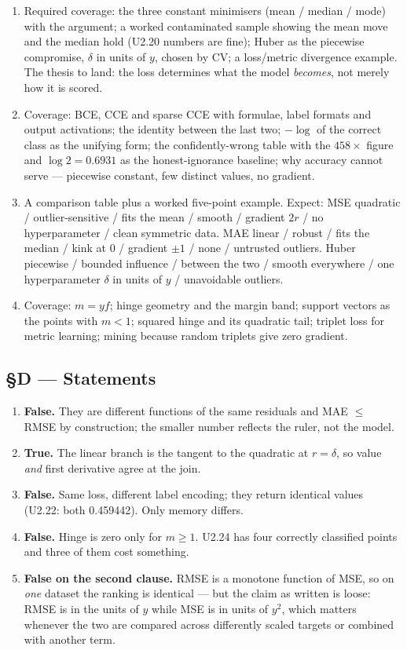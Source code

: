 \documentclass[11pt,a4paper]{article}
\newcommand{\A}[1]{\item[\textbf{#1}]}
\begin{document}
\begin{enumerate}[leftmargin=1.9cm]

\A{U2.30} Required coverage: the three constant minimisers (mean / median /
mode) with the argument; a worked contaminated sample showing the mean move and
the median hold (U2.20 numbers are fine); Huber as the piecewise compromise,
$\delta$ in units of $y$, chosen by CV; a loss/metric divergence example. The
thesis to land: the loss determines what the model \emph{becomes}, not merely
how it is scored.

\A{U2.31} Coverage: BCE, CCE and sparse CCE with formulae, label formats and
output activations; the identity between the last two; $-\log$ of the correct
class as the unifying form; the confidently-wrong table with the $458\times$
figure and $\log 2 = 0.6931$ as the honest-ignorance baseline; why accuracy
cannot serve --- piecewise constant, few distinct values, no gradient.

\A{U2.32} A comparison table plus a worked five-point example. Expect: MSE
quadratic / outlier-sensitive / fits the mean / smooth / gradient $2r$ / no
hyperparameter / clean symmetric data. MAE linear / robust / fits the median /
kink at 0 / gradient $\pm 1$ / none / untrusted outliers. Huber piecewise /
bounded influence / between the two / smooth everywhere / one hyperparameter
$\delta$ in units of $y$ / unavoidable outliers.

\A{U2.33} Coverage: $m = yf$; hinge geometry and the margin band; support
vectors as the points with $m<1$; squared hinge and its quadratic tail; triplet
loss for metric learning; mining because random triplets give zero gradient.

\end{enumerate}

\subsection*{§D --- Statements}

\begin{enumerate}[leftmargin=1.9cm]
\A{U2.34} \textbf{False.} They are different functions of the same residuals
and MAE $\le$ RMSE by construction; the smaller number reflects the ruler, not
the model.
\A{U2.35} \textbf{True.} The linear branch is the tangent to the quadratic at
$r = \delta$, so value \emph{and} first derivative agree at the join.
\A{U2.36} \textbf{False.} Same loss, different label encoding; they return
identical values (U2.22: both 0.459442). Only memory differs.
\A{U2.37} \textbf{False.} Hinge is zero only for $m \ge 1$. U2.24 has four
correctly classified points and three of them cost something.
\A{U2.38} \textbf{False on the second clause.} RMSE is a monotone function of
MSE, so on \emph{one} dataset the ranking is identical --- but the claim as
written is loose: RMSE is in the units of $y$ while MSE is in units of $y^2$,
which matters whenever the two are compared across differently scaled targets
or combined with another term.
\end{enumerate}
\end{document}

